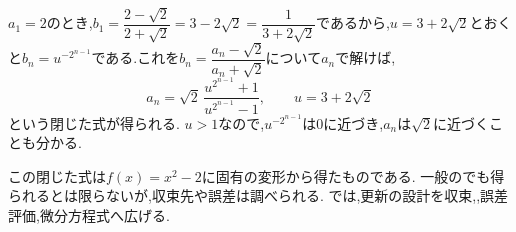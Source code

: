 $a_1=2$のとき,$b_1=\dfrac{2-\sqrt2}{2+\sqrt2}=3-2\sqrt2=\dfrac1{3+2\sqrt2}$であるから,$u=3+2\sqrt2$とおくと$b_n=u^{-2^{n-1}}$である.これを$b_n=\dfrac{a_n-\sqrt2}{a_n+\sqrt2}$について$a_n$で解けば,
\[
  a_n=\sqrt{2}\,\frac{u^{2^{n-1}}+1}{u^{2^{n-1}}-1},\qquad u=3+2\sqrt2
\]
という閉じた式が得られる.
$u>1$なので,$u^{-2^{n-1}}$は$0$に近づき,$a_n$は$\sqrt2$に近づくことも分かる.

この閉じた式は$f(x)=x^2-2$に固有の変形から得たものである.
一般のでも得られるとは限らないが,収束先や誤差は調べられる.
では,更新の設計を収束,,誤差評価,微分方程式へ広げる.
